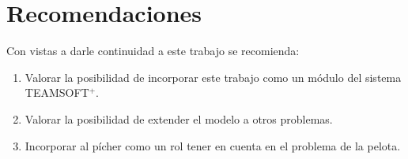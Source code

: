 \chapter*{Recomendaciones}
Con vistas a darle continuidad a este trabajo se recomienda: 
\begin{enumerate}
\item Valorar la posibilidad de incorporar este trabajo como un módulo del sistema TEAMSOFT$^+$.
\item Valorar la posibilidad de extender el modelo a otros problemas.
\item Incorporar al pícher como un rol tener en cuenta en el problema de la pelota.
\end{enumerate}